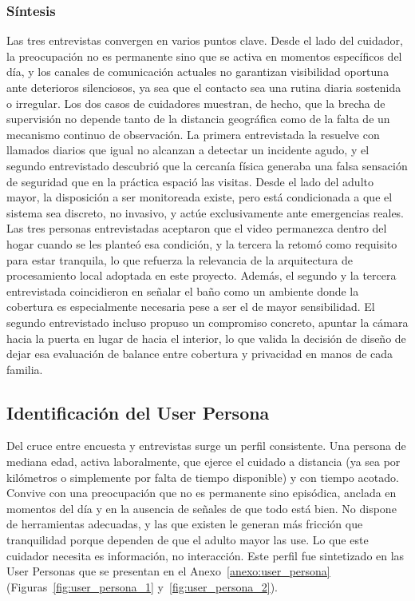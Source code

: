 \subsubsection{Síntesis}

Las tres entrevistas convergen en varios puntos clave.
Desde el lado del cuidador, la preocupación no es permanente sino que se activa en momentos específicos del día, y los canales de comunicación actuales no garantizan visibilidad oportuna ante deterioros silenciosos, ya sea que el contacto sea una rutina diaria sostenida o irregular.
Los dos casos de cuidadores muestran, de hecho, que la brecha de supervisión no depende tanto de la distancia geográfica como de la falta de un mecanismo continuo de observación.
La primera entrevistada la resuelve con llamados diarios que igual no alcanzan a detectar un incidente agudo, y el segundo entrevistado descubrió que la cercanía física generaba una falsa sensación de seguridad que en la práctica espació las visitas.
Desde el lado del adulto mayor, la disposición a ser monitoreada existe, pero está condicionada a que el sistema sea discreto, no invasivo, y actúe exclusivamente ante emergencias reales.
Las tres personas entrevistadas aceptaron que el video permanezca dentro del hogar cuando se les planteó esa condición, y la tercera la retomó como requisito para estar tranquila, lo que refuerza la relevancia de la arquitectura de procesamiento local adoptada en este proyecto.
Además, el segundo y la tercera entrevistada coincidieron en señalar el baño como un ambiente donde la cobertura es especialmente necesaria pese a ser el de mayor sensibilidad.
El segundo entrevistado incluso propuso un compromiso concreto, apuntar la cámara hacia la puerta en lugar de hacia el interior, lo que valida la decisión de diseño de dejar esa evaluación de balance entre cobertura y privacidad en manos de cada familia.

\subsection{Identificación del User Persona}

Del cruce entre encuesta y entrevistas surge un perfil consistente.
Una persona de mediana edad, activa laboralmente, que ejerce el cuidado a distancia (ya sea por kilómetros o simplemente por falta de tiempo disponible) y con tiempo acotado.
Convive con una preocupación que no es permanente sino episódica, anclada en momentos del día y en la ausencia de señales de que todo está bien.
No dispone de herramientas adecuadas, y las que existen le generan más fricción que tranquilidad porque dependen de que el adulto mayor las use.
Lo que este cuidador necesita es información, no interacción.
Este perfil fue sintetizado en las User Personas que se presentan en el Anexo~\ref{anexo:user_persona} (Figuras~\ref{fig:user_persona_1} y~\ref{fig:user_persona_2}).

